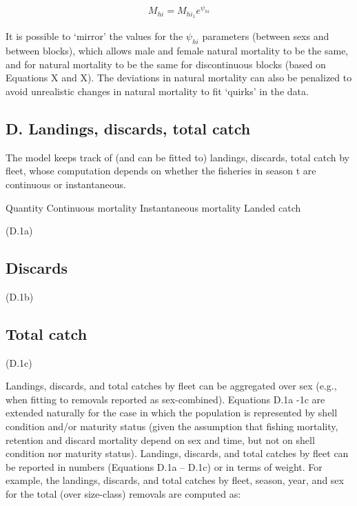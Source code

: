 \documentclass[]{article}
\begin{document}
\begin{align}
          M_{hi} = M_{hi_{1}}e^{\psi_{hi}}
\end{align}

It is possible to `mirror' the values for the \(\psi_{hi}\) parameters
(between sexs and between blocks), which allows male and female natural
mortality to be the same, and for natural mortality to be the same for
discontinuous blocks (based on Equations X and X). The deviations in
natural mortality can also be penalized to avoid unrealistic changes in
natural mortality to fit `quirks' in the data.

\subsection{D. Landings, discards, total
catch}\label{d.-landings-discards-total-catch}

The model keeps track of (and can be fitted to) landings, discards,
total catch by fleet, whose computation depends on whether the fisheries
in season t are continuous or instantaneous.

Quantity Continuous mortality Instantaneous mortality Landed catch

(D.1a)

\subsection{Discards}\label{discards}

(D.1b)

\subsection{Total catch}\label{total-catch}

(D.1c)

Landings, discards, and total catches by fleet can be aggregated over
sex (e.g., when fitting to removals reported as sex-combined). Equations
D.1a -1c are extended naturally for the case in which the population is
represented by shell condition and/or maturity status (given the
assumption that fishing mortality, retention and discard mortality
depend on sex and time, but not on shell condition nor maturity status).
Landings, discards, and total catches by fleet can be reported in
numbers (Equations D.1a -- D.1c) or in terms of weight. For example, the
landings, discards, and total catches by fleet, season, year, and sex
for the total (over size-class) removals are computed as:
\end{document}

